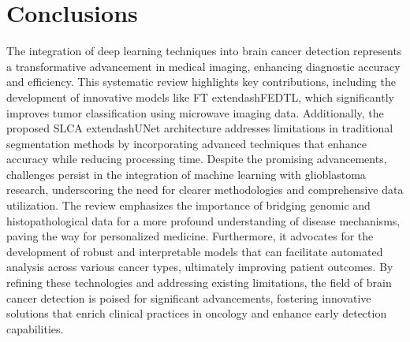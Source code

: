 \documentclass[runningheads]{llncs}
\begin{document}
\section{Conclusions}
The integration of deep learning techniques into brain cancer detection represents a transformative advancement in medical imaging, enhancing diagnostic accuracy and efficiency. This systematic review highlights key contributions, including the development of innovative models like FT	extendash{}FEDTL, which significantly improves tumor classification using microwave imaging data. Additionally, the proposed SLCA	extendash{}UNet architecture addresses limitations in traditional segmentation methods by incorporating advanced techniques that enhance accuracy while reducing processing time. Despite the promising advancements, challenges persist in the integration of machine learning with glioblastoma research, underscoring the need for clearer methodologies and comprehensive data utilization. The review emphasizes the importance of bridging genomic and histopathological data for a more profound understanding of disease mechanisms, paving the way for personalized medicine. Furthermore, it advocates for the development of robust and interpretable models that can facilitate automated analysis across various cancer types, ultimately improving patient outcomes. By refining these technologies and addressing existing limitations, the field of brain cancer detection is poised for significant advancements, fostering innovative solutions that enrich clinical practices in oncology and enhance early detection capabilities.
\end{document}
